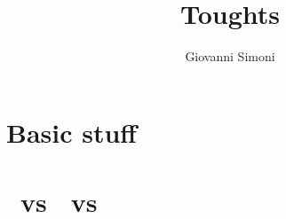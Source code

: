 \documentclass[a3paper]{article}
\title{Toughts}
\author{Giovanni Simoni}
\begin{document}
    \maketitle

    \section{Basic stuff}
    

    \section{\LTL\ vs \CTL\ vs \CTLs}
    
\end{document}

